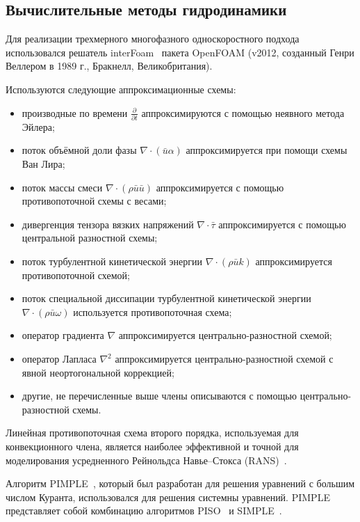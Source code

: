 \documentclass[mathematics,article,accept,pdftex,moreauthors]{Definitions/mdpi}
\begin{document}
\subsection{Вычислительные методы гидродинамики}

Для реализации трехмерного многофазного односкоростного подхода использовался решатель interFoam~\cite{Rusche2003ComputationalFD} пакета OpenFOAM (v2012, созданный Генри Веллером в 1989 г., Бракнелл, Великобритания).

Используются следующие аппроксимационные схемы:
\begin{itemize}
	\item производные по времени $\frac{\partial}{\partial t}$ аппроксимируются с помощью неявного метода Эйлера;
	\item поток объёмной доли фазы $ {\nabla} \cdot (\bar{ {u}} \alpha)$ аппроксимируется при помощи схемы Ван Лира;
	\item поток массы смеси $ {\nabla} \cdot (\rho \bar{ {u}} \bar{ {u}})$ аппроксимируется с помощью противопоточной схемы с весами;
	\item дивергенция тензора вязких напряжений $ {\nabla} \cdot \bar{ {\tau}}$ аппроксимируется с помощью центральной разностной схемы;
	\item поток турбулентной кинетической энергии $ {\nabla} \cdot (\rho \bar{ {u}} k)$ аппроксимируется противопоточной схемой;
	\item поток специальной диссипации турбулентной кинетической энергии $ {\nabla} \cdot (\rho \bar{ {u}} \omega)$ используется противопоточная схема;
	\item оператор градиента $ {\nabla}$ аппроксимируется центрально-разностной схемой;
	\item оператор Лапласа $ {\nabla}^2$ аппроксимируется центрально-разностной схемой с явной неортогональной коррекцией;
	\item другие, не перечисленные выше члены описываются с помощью центрально-разностной схемы.
\end{itemize}

Линейная противопоточная схема второго порядка, используемая для конвекционного члена, является наиболее эффективной и точной для моделирования усредненного Рейнольдса Навье--Стокса (RANS)~\cite{ROBERTSON2015122}.

Алгоритм PIMPLE~\cite{Holzmann2019, Yin2003}, который был разработан для решения уравнений с большим числом Куранта, использовался для решения системны уравнений. PIMPLE представляет собой комбинацию алгоритмов PISO~\cite{Issa1986_2} и SIMPLE~\cite{Issa1986_1}.
\end{document}
